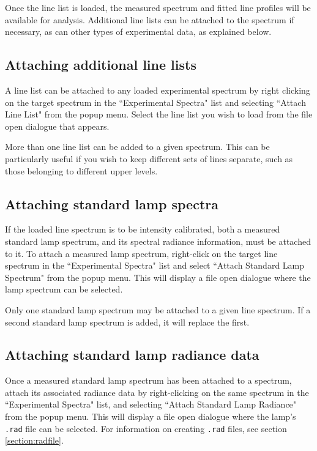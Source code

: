 \documentclass[a4paper,12pt]{report}
\begin{document}
Once the line list is loaded, the measured spectrum and fitted line profiles will be available for analysis. Additional line lists can be attached to the spectrum if necessary, as can other types of experimental data, as explained below.


\subsection{Attaching additional line lists}
A line list can be attached to any loaded experimental spectrum by right clicking on the target spectrum in the ``Experimental Spectra" list and selecting ``Attach Line List" from the popup menu. Select the line list you wish to load from the file open dialogue that appears.

More than one line list can be added to a given spectrum. This can be particularly useful if you wish to keep different sets of lines separate, such as those belonging to different upper levels.

\subsection{Attaching standard lamp spectra}
If the loaded line spectrum is to be intensity calibrated, both a measured standard lamp spectrum, and its spectral radiance information, must be attached to it. To attach a measured lamp spectrum, right-click on the target line spectrum in the ``Experimental Spectra" list and select ``Attach Standard Lamp Spectrum" from the popup menu. This will display a file open dialogue where the lamp spectrum can be selected.

Only one standard lamp spectrum may be attached to a given line spectrum. If a second standard lamp spectrum is added, it will replace the first.

\subsection{Attaching standard lamp radiance data}
Once a measured standard lamp spectrum has been attached to a spectrum, attach its associated radiance data by right-clicking on the same spectrum in the ``Experimental Spectra" list, and selecting ``Attach Standard Lamp Radiance" from the popup menu. This will display a file open dialogue where the lamp's \verb|.rad| file can be selected. For information on creating \verb|.rad| files, see section \ref{section:radfile}.
\end{document}
